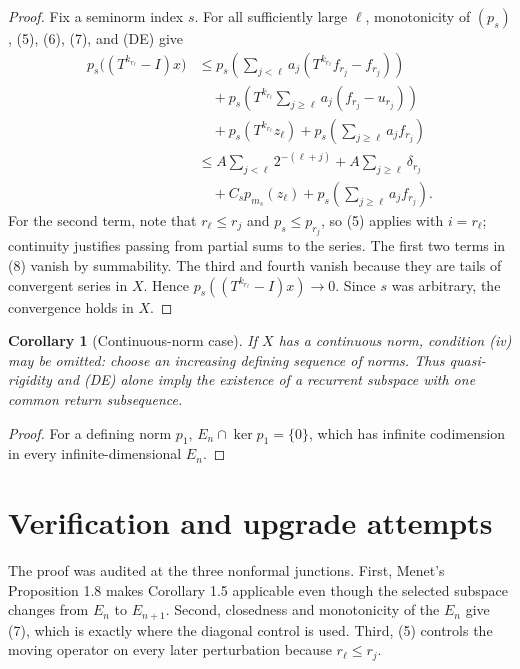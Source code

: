 \documentclass[10pt]{article}
\newtheorem{corollary}[theorem]{Corollary}
\begin{document}
\begin{proof}
Fix a seminorm index $s$.  For all sufficiently large $\ell$, monotonicity of
$(p_s)$, (5), (6), (7), and (DE) give
\begin{align*}
p_s\bigl((T^{k_{r_\ell}}-I)x\bigr)
&\leq
p_s\!\left(\sum_{j<\ell}a_j(T^{k_{r_\ell}}f_{r_j}-f_{r_j})\right)\\
&\quad+p_s\!\left(T^{k_{r_\ell}}\sum_{j\geq\ell}a_j(f_{r_j}-u_{r_j})\right)\\
&\quad+p_s(T^{k_{r_\ell}}z_\ell)
   +p_s\!\left(\sum_{j\geq\ell}a_jf_{r_j}\right)\\
&\leq
A\sum_{j<\ell}2^{-(\ell+j)}
+A\sum_{j\geq\ell}\delta_{r_j}\\
&\quad+C_s p_{m_s}(z_\ell)
   +p_s\!\left(\sum_{j\geq\ell}a_jf_{r_j}\right).
\tag{8}
\end{align*}
For the second term, note that $r_\ell\leq r_j$ and $p_s\leq p_{r_j}$, so (5) applies with $i=r_\ell$; continuity justifies passing from partial sums to the series.  The first two terms in (8) vanish by summability.  The third and fourth vanish because they are tails of convergent series in $X$.  Hence
$p_s((T^{k_{r_\ell}}-I)x)\to0$.  Since $s$ was arbitrary, the convergence holds in $X$.
\end{proof}

\begin{corollary}[Continuous-norm case]
If $X$ has a continuous norm, condition \textup{(iv)} may be omitted: choose an increasing defining sequence of norms.  Thus quasi-rigidity and \textup{(DE)} alone imply the existence of a recurrent subspace with one common return subsequence.
\end{corollary}

\begin{proof}
For a defining norm $p_1$, $E_n\cap\ker p_1=\{0\}$, which has infinite codimension in every infinite-dimensional $E_n$.
\end{proof}

\section*{Verification and upgrade attempts}

The proof was audited at the three nonformal junctions.  First, Menet's Proposition 1.8 makes Corollary 1.5 applicable even though the selected subspace changes from $E_n$ to $E_{n+1}$.  Second, closedness and monotonicity of the $E_n$ give (7), which is exactly where the diagonal control is used.  Third, (5) controls the moving operator on every later perturbation because $r_\ell\leq r_j$.
\end{document}
